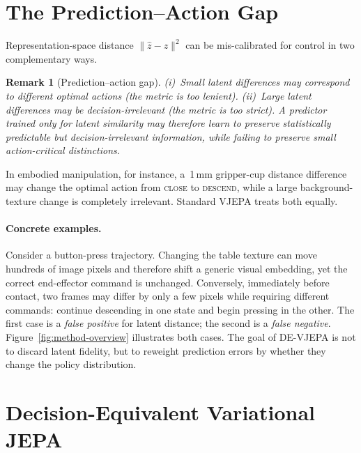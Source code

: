 \documentclass[10pt,twocolumn]{article}
\theoremstyle{tightstyle}
\newtheorem{remark}{Remark}
\begin{document}
\section{The Prediction--Action Gap}
\label{sec:gap}

Representation-space distance $\|\hat{z}-z\|^2$ can be mis-calibrated for control
in two complementary ways.

\begin{remark}[Prediction--action gap]
(i)~Small latent differences may correspond to different optimal actions (the metric
is too lenient).
(ii)~Large latent differences may be decision-irrelevant (the metric is too strict).
A predictor trained only for latent similarity may therefore learn to preserve
statistically predictable but decision-irrelevant information, while failing to
preserve small action-critical distinctions.
\end{remark}

In embodied manipulation, for instance, a~1\,mm gripper-cup distance difference
may change the optimal action from \textsc{close} to \textsc{descend}, while a
large background-texture change is completely irrelevant.
Standard VJEPA treats both equally.

\paragraph{Concrete examples.}
Consider a button-press trajectory. Changing the table texture can move hundreds
of image pixels and therefore shift a generic visual embedding, yet the correct
end-effector command is unchanged. Conversely, immediately before contact, two
frames may differ by only a few pixels while requiring different commands:
continue descending in one state and begin pressing in the other. The first case
is a \emph{false positive} for latent distance; the second is a \emph{false
negative}. Figure~\ref{fig:method-overview} illustrates both cases. The goal of
DE-VJEPA is not to discard latent fidelity, but to reweight prediction errors by
whether they change the policy distribution.

\section{Decision-Equivalent Variational JEPA}
\label{sec:devjepa}
\end{document}
